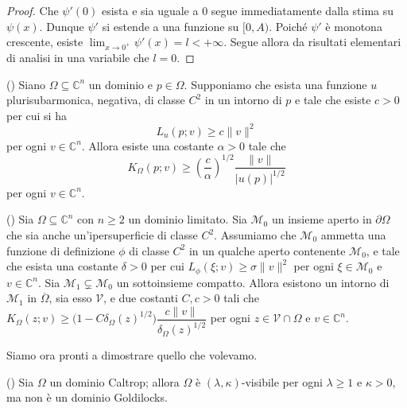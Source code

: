 \begin{proof}
    Che $\psi'(0)$ esista e sia uguale a $0$ segue immediatamente dalla stima su $\psi(x)$. Dunque $\psi'$ si estende a una funzione su $[0,A)$. Poiché $\psi'$ è monotona crescente, esiste $\displaystyle\lim_{x\longrightarrow0^+}\psi'(x)=l<+\infty$. Segue allora da risultati elementari di analisi in una variabile che $l=0$.
\end{proof}

\begin{lm} \label{pshestimate}
    (\cite[Result 2.6]{BM}) Siano $\Omega\subseteq\mathbb{C}^n$ un dominio e $p\in\Omega$. Supponiamo che esista una funzione $u$ plurisubarmonica, negativa, di classe $C^2$ in un intorno di $p$ e tale che esiste $c>0$ per cui si ha
    $$L_u(p;v) \ge c\|v\|^2$$
    per ogni $v\in\mathbb{C}^n$. Allora esiste una costante $\alpha>0$ tale che
    $$K_\Omega(p;v)\ge\left(\frac{c}{\alpha}\right)^{1/2}\frac{\|v\|}{|u(p)|^{1/2}}$$
    per ogni $v\in\mathbb{C}^n$.
\end{lm}

\begin{lm}\label{psdcvxcpt}
    (\cite[Result 2.4]{BM}) Sia $\Omega\subseteq\mathbb{C}^n$ con $n\ge 2$ un dominio limitato. Sia $\mathcal{M}_0$ un insieme aperto in $\partial\Omega$ che sia anche un'ipersuperficie di classe $C^2$. Assumiamo che $\mathcal{M}_0$ ammetta una funzione di definizione $\phi$ di classe $C^2$ in un qualche aperto contenente $\mathcal{M}_0$, e tale che esista una costante $\delta>0$ per cui $L_\phi(\xi;v)\ge\sigma\|v\|^2$ per ogni $\xi\in\mathcal{M}_0$ e $v\in\mathbb{C}^n$. Sia $\mathcal{M}_1\subsetneq\mathcal{M}_0$ un sottoinsieme compatto. Allora esistono un intorno di $\mathcal{M}_1$ in $\overline{\Omega}$, sia esso $\mathcal{V}$, e due costanti $C,c>0$ tali che $K_\Omega(z;v)\ge \big(1-C\delta_\Omega(z)^{1/2}\big)\dfrac{c\|v\|}{\delta_\Omega(z)^{1/2}}$ per ogni $z\in\mathcal{V}\cap\Omega$ e $v\in\mathbb{C}^n$.
\end{lm}

Siamo ora pronti a dimostrare quello che volevamo.

\begin{thm}
    (\cite[Theorem 1.4]{BM}) Sia $\Omega$ un dominio Caltrop; allora $\Omega$ è $(\lambda,\kappa)$-visibile per ogni $\lambda \ge 1$ e $\kappa>0$, ma non è un dominio Goldilocks.
\end{thm}

